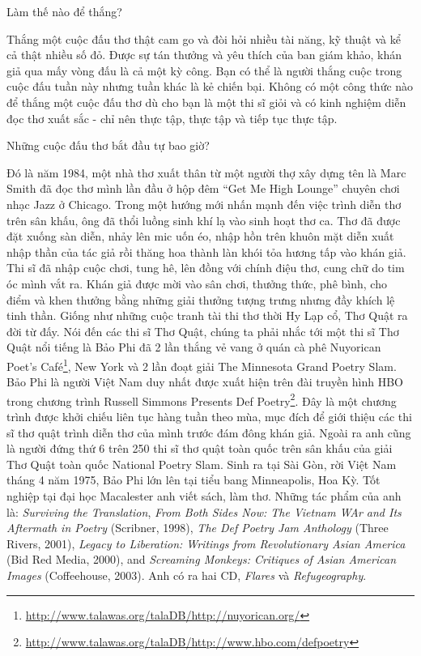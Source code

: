 \documentclass[../main.tex]{subfiles}
\begin{document}
\begin{multicols}{2}
\begin{itemize}
\end{itemize}
 Làm thế nào để thắng? 
 
Thắng một cuộc đấu thơ thật cam go và đòi hỏi nhiều tài năng, kỹ thuật và kể cả thật nhiều số đỏ. Được sự tán thưởng và yêu thích của ban giám khảo, khán giả qua mấy vòng đấu là cả một kỳ công. Bạn có thể là người thắng cuộc trong cuộc đấu tuần này nhưng tuần khác là kẻ chiến bại. Không có một công thức nào để thắng một cuộc đấu thơ dù cho bạn là một thi sĩ giỏi và có kinh nghiệm diễn đọc thơ xuất sắc - chỉ nên thực tập, thực tập và tiếp tục thực tập.  
 
Những cuộc đấu thơ bắt đầu tự bao giờ? 
 
Đó là năm 1984, một nhà thơ xuất thân từ một người thợ xây dựng tên là Marc Smith đã đọc thơ mình lần đầu ở hộp đêm “Get Me High Lounge” chuyên chơi nhạc Jazz ở Chicago. Trong một hướng mới nhấn mạnh đến việc trình diễn thơ trên sân khấu, ông đã thổi luồng sinh khí lạ vào sinh hoạt thơ ca. Thơ đã được đặt xuống sàn diễn, nhảy lên mic uốn éo, nhập hồn trên khuôn mặt diễn xuất nhập thần của tác giả rồi thăng hoa thành làn khói tỏa hương tấp vào khán giả. Thi sĩ đã nhập cuộc chơi, tung hê, lên đồng với chính điệu thơ, cung chữ do tim óc mình vắt ra. Khán giả được mời vào sân chơi, thưởng thức, phê bình, cho điểm và khen thưởng bằng những giải thưởng tượng trưng nhưng đầy khích lệ tinh thần. Giống như những cuộc tranh tài thi thơ thời Hy Lạp cổ, Thơ Quật ra đời từ đấy. 
Nói đến các thi sĩ Thơ Quật, chúng ta phải nhắc tới  một thi sĩ Thơ Quật nổi tiếng là Bảo Phi đã 2 lần thắng vẻ vang ở quán cà phê Nuyorican Poet's Café\footnote{\url{http://www.talawas.org/talaDB/http://nuyorican.org/}}, New York và 2 lần đoạt giải The Minnesota Grand Poetry Slam. Bảo Phi là người Việt Nam duy nhất được xuất hiện trên đài truyền hình HBO trong chương trình Russell Simmons Presents Def Poetry\footnote{\url{http://www.talawas.org/talaDB/http://www.hbo.com/defpoetry}}. Đây là một chương trình được khởi chiếu liên tục hàng tuần theo mùa, mục đích để giới thiệu các thi sĩ thơ quật trình diễn thơ của mình trước đám đông khán giả. Ngoài ra anh cũng là người đứng thứ 6 trên 250 thi sĩ thơ quật toàn quốc trên sân khấu của giải Thơ Quật toàn quốc National Poetry Slam. 
Sinh ra tại Sài Gòn, rời Việt Nam tháng 4 năm 1975, Bảo Phi lớn lên tại tiểu bang Minneapolis, Hoa Kỳ. Tốt nghiệp tại đại học Macalester anh viết sách, làm thơ. Những tác phẩm của anh là: \textit{Surviving the Translation}, \textit{From Both Sides Now: The Vietnam WAr and Its Aftermath in Poetry} (Scribner, 1998), \textit{The Def Poetry Jam Anthology } (Three Rivers, 2001), \textit{Legacy to Liberation: Writings from Revolutionary Asian America} (Bid Red Media, 2000), and \textit{Screaming Monkeys: Critiques of Asian American Images} (Coffeehouse, 2003).  Anh có ra hai CD, \textit{Flares} và \textit{Refugeography}.  
 

\end{multicols}
\end{document}
